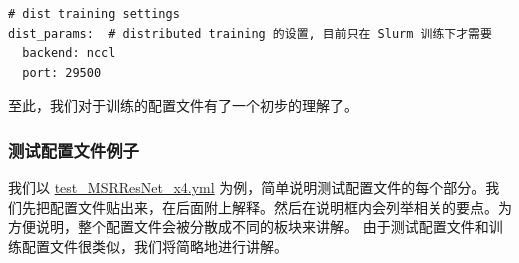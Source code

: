 \documentclass[../main.tex]{subfiles}
\begin{document}
\begin{verbatim}
# dist training settings
dist_params:  # distributed training 的设置, 目前只在 Slurm 训练下才需要
  backend: nccl
  port: 29500
\end{verbatim}

至此，我们对于训练的配置文件有了一个初步的理解了。

\subsubsection{测试配置文件例子}\label{code_structure:test_config}

我们以 \href{https://github.com/XPixelGroup/BasicSR/blob/master/options/test/SRResNet_SRGAN/test_MSRResNet_x4.yml}{test\_MSRResNet\_x4.yml} 为例，简单说明测试配置文件的每个部分。我们先把配置文件贴出来，在后面附上解释。然后在说明框内会列举相关的要点。为方便说明，整个配置文件会被分散成不同的板块来讲解。
由于测试配置文件和训练配置文件很类似，我们将简略地进行讲解。
\end{document}
